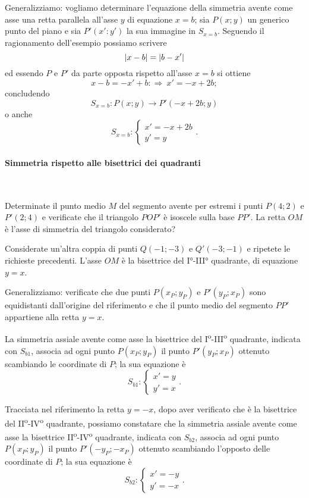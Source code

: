 Generalizziamo: vogliamo determinare l'equazione della simmetria avente come asse una retta parallela all'asse $y$ di equazione $x=b$; sia $P(x;y)$ un generico punto del piano e sia $P'(x':y')$ la sua immagine in $S_{x=b}$. Seguendo il ragionamento dell'esempio possiamo scrivere \[\left|x-b\right|=\left|b-x'\right|\]
ed essendo $P$ e $P'$ da parte opposta rispetto all'asse $x=b$ si ottiene
\[x-b=-x'+b:\Rightarrow\: x'=-x+2b;\]
concludendo
\[S_{x=b}:P(x;y)\rightarrow P'(-x+2b;y)\]
o anche
\[S_{x=b}:\begin{cases}x'=-x+2b\\y'=y \end{cases}.\]


\paragraph{Simmetria rispetto alle bisettrici dei quadranti}
~

\begin{exrig}
\begin{esempio}
Determinate il punto medio $M$ del segmento avente per estremi i punti $P(4;2)$ e $P'(2;4)$ e verificate che il triangolo $POP'$ è isoscele sulla base $PP'$. 
La retta $OM$ è l'asse di simmetria del triangolo considerato?

\begin{figure*}[!htb]
	\centering
\end{figure*}

Considerate un'altra coppia di punti $Q(-1;-3)$ e $Q'(-3;-1)$ e ripetete le richieste precedenti.
L'asse $OM$ è la bisettrice del I°-III° quadrante, di equazione $y=x$.
\end{esempio}
\end{exrig}

Generalizziamo: verificate che due punti $P(x_P;y_P)$ e $P'(y_P;x_P)$ sono equidistanti dall'origine del riferimento e che il punto medio del segmento $PP'$ appartiene alla retta $y=x$.

La simmetria assiale avente come asse la bisettrice del I\textsuperscript{o}-III\textsuperscript{o} quadrante, indicata con $S_{b1}$, associa ad ogni punto $P(x_P;y_P)$ il punto $P'(y_P;x_P)$ ottenuto scambiando le coordinate di $P$; la sua equazione è
\[S_{b1}:\begin{cases}x'=y\\y'=x \end{cases}.\]

Tracciata nel riferimento la retta $y=-x$, dopo aver verificato che è la bisettrice del II\textsuperscript{o}-IV\textsuperscript{o} quadrante, possiamo constatare che la simmetria assiale avente come asse la bisettrice II\textsuperscript{o}-IV\textsuperscript{o} quadrante, indicata con $S_{b2}$, associa ad ogni punto $P(x_P;y_P)$ il punto $P'(-y_P;-x_P)$ ottenuto scambiando l'opposto delle coordinate di $P$; la sua equazione è
\[S_{b2}:\begin{cases}x'=-y\\y'=-x \end{cases}.\]



